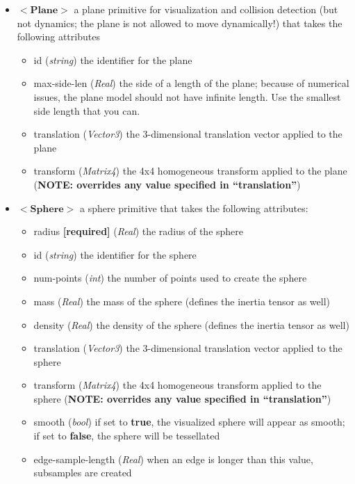 \documentclass{article}
\begin{document}
\begin{landscape}
\begin{itemize}
\item $<\textbf{Plane}>$ a plane primitive for visualization and collision detection (but not dynamics; the plane is not allowed to move dynamically!) that takes the following attributes
\begin{itemize}
\item id  (\emph{string})  the identifier for the plane 
\item max-side-len (\emph{Real}) the side of a length of the plane; because of numerical issues, the plane model should not have infinite length.  Use the smallest side length that you can.
\item translation (\emph{Vector3}) the 3-dimensional translation vector applied to the plane
\item transform (\emph{Matrix4}) the 4x4 homogeneous transform applied to the plane (\textbf{NOTE: overrides any value specified in ``translation''})
\end{itemize}

\item $<\textbf{Sphere}>$ a sphere primitive that takes the following attributes:
\begin{itemize}
\item radius \textbf{[required]} (\emph{Real}) the radius of the sphere
\item id  (\emph{string}) the identifier for the sphere
\item num-points (\emph{int}) the number of points used to create the sphere 
\item mass (\emph{Real}) the mass of the sphere (defines the inertia tensor as well)
\item density (\emph{Real})  the density of the sphere  (defines the inertia tensor as well)
\item translation (\emph{Vector3}) the 3-dimensional translation vector applied to the sphere
\item transform (\emph{Matrix4}) the 4x4 homogeneous transform applied to the sphere (\textbf{NOTE: overrides any value specified in ``translation''})
\item smooth (\emph{bool})  if set to \textbf{true}, the visualized sphere will appear as smooth; if set to \textbf{false}, the sphere will be tessellated
\item edge-sample-length (\emph{Real}) when an edge is longer than this value, subsamples are created
\end{itemize}


\end{itemize}
\end{landscape}
\end{document}
